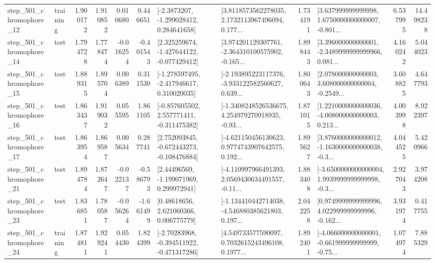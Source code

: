 \begin{tabular}{llrrrrllrlrr}
  step\_501\_chromophore\_12 &  training &      1.900172 &    1.910852 &      0.010680 &  0.446651 &     [-2.3873207, -1.299028412, 0.284641658] &  [3.8118573562278035, 2.1732113967496094, 0.177... &       1.734191 &  [3.637999999999998, 1.6750000000000007, -0.801... &            6.537995 &         14.498238 \\
  step\_501\_chromophore\_14 &      test &      1.794728 &    1.778474 &     -0.016254 & -0.401543 &   [2.325259674, -1.427644122, -0.077429412] &  [3.974201129307761, -2.364310100575902, -0.165... &       1.898443 &  [3.396000000000001, -2.3489999999999966, 0.081... &            4.160242 &          5.044023 \\
  step\_501\_chromophore\_15 &      test &      1.889315 &    1.895704 &      0.006389 &  0.311530 &   [-1.278597495, -2.417946617, 0.310020035] &  [-2.193895223117376, -3.933122582560627, 0.639... &       1.800643 &  [2.078000000000003, 3.608000000000004, -0.2549... &            3.608825 &          4.647793 \\
  step\_501\_chromophore\_16 &      test &      1.863437 &    1.919032 &      0.055595 &  1.861105 &   [-0.857605502, 2.557771411, -0.311475382] &  [-1.3408248526536675, 4.254979270918935, -0.93... &       1.871015 &  [1.2210000000000036, -4.008000000000003, 0.213... &            4.003998 &          8.922397 \\
  step\_501\_chromophore\_17 &      test &      1.863954 &    1.869587 &      0.005634 &  0.287741 &   [2.752093845, -0.672443273, -0.108476884] &  [-4.621150456130623, 0.9774743907642575, 0.192... &       1.895627 &  [3.8760000000000012, -1.1630000000000038, -0.3... &            4.044525 &          5.420966 \\
  step\_501\_chromophore\_21 &      test &      1.894784 &    1.872647 &     -0.022137 & -0.586793 &     [2.44496569, -1.199071969, 0.299972941] &  [-4.110997966491393, 2.0569430634491557, -0.11... &       1.883408 &  [-3.6500000000000004, 1.9939999999999998, -0.3... &            2.927043 &          3.974208 \\
  step\_501\_chromophore\_23 &      test &      1.836851 &    1.780587 &     -0.056264 & -1.661499 &      [0.48618656, 2.621060366, 0.006775779] &  [-1.134410442714038, -4.546880385621803, 0.197... &       2.042258 &  [0.9749999999999996, 4.022999999999996, -0.162... &            3.931974 &          0.417755 \\
  step\_501\_chromophore\_24 &  training &      1.874811 &    1.929241 &      0.054430 &  1.824399 &   [-2.70283968, -0.394511922, -0.471317286] &  [4.549733577590097, 0.7032615243496108, 0.1977... &       1.892401 &  [-4.066000000000001, -0.661999999999999, -0.75... &            1.074974 &          7.885329 \\

\end{tabular}
